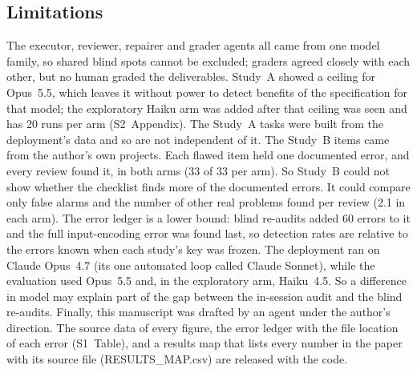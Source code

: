 \subsection*{Limitations}
The executor, reviewer, repairer and grader agents all came from one model
family, so shared blind spots cannot be excluded; graders agreed closely
with each other, but no human graded the deliverables. Study~A showed a
ceiling for Opus~5.5, which leaves it without power to detect benefits of
the specification for that model; the exploratory Haiku arm was added
after that ceiling was seen and has 20 runs per arm (S2~Appendix). The Study~A tasks were built from the
deployment's data and so are not independent of it. The Study~B items
came from the author's own projects. Each flawed item held one documented
error, and every review found it, in both arms (33 of 33 per arm). So
Study~B could not show whether the checklist finds more of the documented
errors. It could compare only false alarms and the number of other real
problems found per review (2.1 in each arm). The error ledger is a lower bound:
blind re-audits added 60 errors to it and the full input-encoding error was
found last, so detection rates are relative to the errors known when
each study's key was frozen. The deployment ran on Claude Opus~4.7 (its
one automated loop called Claude Sonnet), while the evaluation used
Opus~5.5 and, in the exploratory arm, Haiku~4.5. So a difference in
model may explain part of the gap between the in-session audit and the
blind re-audits. Finally, this manuscript
was drafted by an agent under the author's direction. The source data of
every figure, the error ledger with the file location of each error
(S1~Table), and a results map that lists every number in the paper with
its source file (RESULTS\_MAP.csv) are released with the code.
